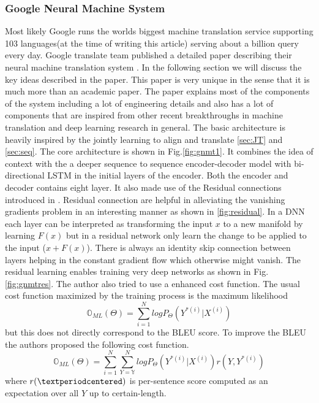 \documentclass[conference]{IEEEtran}
\begin{document}
\subsubsection{Google Neural Machine System}
Most likely Google runs the worlds biggest  \cite{WinNT} machine translation service supporting 103 languages(at the time of writing this article) serving about a 
billion query every day. Google translate team published a detailed paper describing their neural machine translation system \cite{wu2016google}. In the following section we will discuss the key ideas described in the paper. This paper is very unique in the sense that it is much more than an academic paper. The paper explains most of the components of the system including a lot of engineering details and also has a lot of components that are inspired from other recent breakthroughs in machine translation and deep learning research in general. The basic architecture is heavily inspired by the jointly learning to align and translate \ref{sec:JT}  and \ref{sec:seq}. The core architecture is shown in Fig.\ref{fig:gnmt1}. It combines the idea of context with the a deeper sequence to sequence encoder-decoder model with bi-directional LSTM in the initial layers of the encoder. Both the encoder and decoder contains eight layer. It also made use of the Residual connections introduced in \cite{he2016deep}. Residual connection are helpful in alleviating the vanishing gradients problem in an interesting manner as shown in \ref{fig:residual}. In a DNN each layer can be interpreted as transforming the input $x$ to a new manifold by learning $F(x)$ but in a residual network only learn the change to be applied to the input ($x + F(x)$). There is always an identity skip connection between layers helping in the constant gradient flow which otherwise might vanish. The residual learning enables training very deep networks as shown in Fig.\ref{fig:gnmtres}.
The author also tried to use a enhanced cost function. The usual cost function maximized by the training process is the maximum likelihood $$\mathbb{O}_{ML}(\Theta) = \sum_{i=1}^N log P_\Theta(Y^{*(i)} | X^{(i)}) $$ but this does not directly correspond to the BLEU score. To improve the BLEU the authors proposed the following cost function. $$ \mathbb{O}_{ML}(\Theta) = \sum_{i=1}^N \sum_{Y=\mathbb{Y}}^N log P_\Theta(Y^{*(i)} | X^{(i)}) r(Y, Y^{*(i)} ) $$
 where $r(\textperiodcentered)$ is per-sentence score computed as an expectation over all $Y$ up to certain-length.
 
\end{document}
